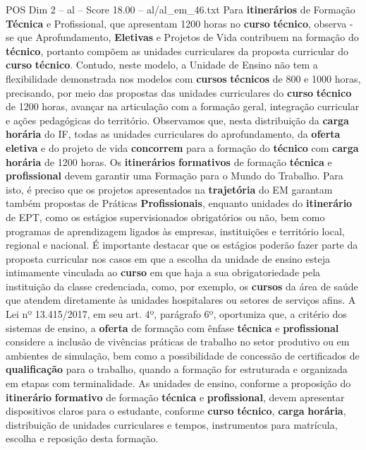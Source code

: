 \begin{textsample}{POS Dim 2 – al – Score 18.00 – al/al\_em\_46.txt}  \label{ex:f2_pos_270}
Para \textbf{itinerários} de Formação \textbf{Técnica} e Profissional, que apresentam 1200 horas no \textbf{curso} \textbf{técnico}, observa -se que Aprofundamento, \textbf{Eletivas} e Projetos de Vida contribuem na formação do \textbf{técnico}, portanto compõem as unidades curriculares da proposta curricular do \textbf{curso} \textbf{técnico}.
Contudo, neste modelo, a Unidade de Ensino não tem a flexibilidade demonstrada nos modelos com \textbf{cursos} \textbf{técnicos} de 800 e 1000 horas, precisando, por meio das propostas das unidades curriculares do \textbf{curso} \textbf{técnico} de 1200 horas, avançar na articulação com a formação geral, integração curricular e ações pedagógicas do território.
Observamos que, nesta distribuição da \textbf{carga} \textbf{horária} do IF, todas as unidades curriculares do aprofundamento, da \textbf{oferta} \textbf{eletiva} e do projeto de vida \textbf{concorrem} para a formação do \textbf{técnico} com \textbf{carga} \textbf{horária} de 1200 horas.
Os \textbf{itinerários} \textbf{formativos} de formação \textbf{técnica} e \textbf{profissional} devem garantir uma Formação para o Mundo do Trabalho.
Para isto, é preciso que os projetos apresentados na \textbf{trajetória} do EM garantam também propostas de Práticas \textbf{Profissionais}, enquanto unidades do \textbf{itinerário} de EPT, como os estágios supervisionados obrigatórios ou não, bem como programas de aprendizagem ligados às empresas, instituições e território local, regional e nacional.
É importante destacar que os estágios poderão fazer parte da proposta curricular nos casos em que a escolha da unidade de ensino esteja intimamente vinculada ao \textbf{curso} em que haja a sua obrigatoriedade pela instituição da classe credenciada, como, por exemplo, os \textbf{cursos} da área de saúde que atendem diretamente às unidades hospitalares ou setores de serviços afins.
A Lei nº 13.415/2017, em seu art. 4º, parágrafo 6º, oportuniza que, a critério dos sistemas de ensino, a \textbf{oferta} de formação com ênfase \textbf{técnica} e \textbf{profissional} considere a inclusão de vivências práticas de trabalho no setor produtivo ou em ambientes de simulação, bem como a possibilidade de concessão de certificados de \textbf{qualificação} para o trabalho, quando a formação for estruturada e organizada em etapas com terminalidade.
As unidades de ensino, conforme a proposição do \textbf{itinerário} \textbf{formativo} de formação \textbf{técnica} e \textbf{profissional}, devem apresentar dispositivos claros para o estudante, conforme \textbf{curso} \textbf{técnico}, \textbf{carga} \textbf{horária}, distribuição de unidades curriculares e tempos, instrumentos para matrícula, escolha e reposição desta formação.

\end{textsample}
